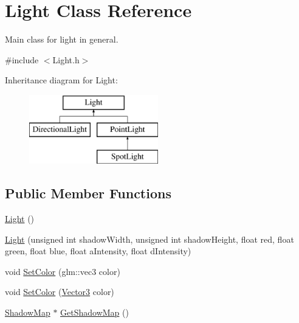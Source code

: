\hypertarget{class_light}{}\section{Light Class Reference}
\label{class_light}


Main class for light in general.  




{\ttfamily \#include $<$Light.\+h$>$}

Inheritance diagram for Light\+:\begin{figure}[H]
\begin{center}
\leavevmode
\includegraphics[height=3.000000cm]{class_light}
\end{center}
\end{figure}
\subsection*{Public Member Functions}
\begin{DoxyCompactItemize}
\item 
\mbox{\hyperlink{class_light_aeb5df09a25a32f19fdffa761268ba24f}{Light}} ()
\item 
\mbox{\hyperlink{class_light_a93768f02e5a374864a6ac7db1dc0d852}{Light}} (unsigned int shadow\+Width, unsigned int shadow\+Height, float red, float green, float blue, float a\+Intensity, float d\+Intensity)
\item 
void \mbox{\hyperlink{class_light_a8f8a8fea92c0de4dcf67c77ac835fe29}{Set\+Color}} (glm\+::vec3 color)
\item 
void \mbox{\hyperlink{class_light_a002cd53d4e244c97f2e101e2430613e5}{Set\+Color}} (\mbox{\hyperlink{struct_vector3}{Vector3}} color)
\item 
\mbox{\hyperlink{class_shadow_map}{Shadow\+Map}} $\ast$ \mbox{\hyperlink{class_light_ae26ee6e7974351161dae2c2ddee9584c}{Get\+Shadow\+Map}} ()
\end{DoxyCompactItemize}
